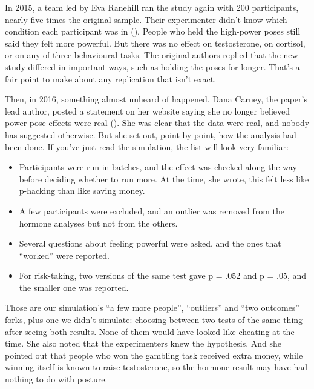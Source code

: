 \documentclass[
]{book}
\providecommand{\tightlist}{%
  \setlength{\itemsep}{0pt}\setlength{\parskip}{0pt}}
\begin{document}
In 2015, a team led by Eva Ranehill ran the study again with 200 participants, nearly five times the original sample. Their experimenter didn't know which condition each participant was in (). People who held the high-power poses still said they felt more powerful. But there was no effect on testosterone, on cortisol, or on any of three behavioural tasks. The original authors replied that the new study differed in important ways, such as holding the poses for longer. That's a fair point to make about any replication that isn't exact.

Then, in 2016, something almost unheard of happened. Dana Carney, the paper's lead author, posted a statement on her website saying she no longer believed power pose effects were real (). She was clear that the data were real, and nobody has suggested otherwise. But she set out, point by point, how the analysis had been done. If you've just read the simulation, the list will look very familiar:

\begin{itemize}
\tightlist
\item
  Participants were run in batches, and the effect was checked along the way before deciding whether to run more. At the time, she wrote, this felt less like p-hacking than like saving money.
\item
  A few participants were excluded, and an outlier was removed from the hormone analyses but not from the others.
\item
  Several questions about feeling powerful were asked, and the ones that ``worked'' were reported.
\item
  For risk-taking, two versions of the same test gave p = .052 and p = .05, and the smaller one was reported.
\end{itemize}

Those are our simulation's ``a few more people'', ``outliers'' and ``two outcomes'' forks, plus one we didn't simulate: choosing between two tests of the same thing after seeing both results. None of them would have looked like cheating at the time. She also noted that the experimenters knew the hypothesis. And she pointed out that people who won the gambling task received extra money, while winning itself is known to raise testosterone, so the hormone result may have had nothing to do with posture.
\end{document}
